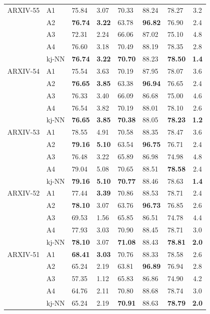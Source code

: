 \begin{table}
\begin{tabularx}{\columnwidth}{XXXXXXX|c}
		ARXIV-55 & A1    & 75.84  & 3.07  & 70.33  & 88.24       & 78.27 & 3.2  \\
		& A2    & \bfseries76.74  & \bfseries3.22  & 63.78  & \bfseries96.82       & 76.90 & 2.4  \\
		& A3    & 72.31  & 2.24  & 66.06  & 87.02       & 75.10 & 4.8  \\
		& A4    & 76.60  & 3.18  & 70.49  & 88.19       & 78.35 & 2.8  \\
		& \gls{kj-NN} & \bfseries76.74  & \bfseries3.22  & \bfseries70.70  & 88.23       & \bfseries78.50 & \bfseries1.4  \\ \midrule
		ARXIV-54 & A1    & 75.54  & 3.63  & 70.19  & 87.95       & 78.07 & 3.6  \\
		& A2    & \bfseries76.65  & \bfseries3.85  & 63.38  & \bfseries96.94       & 76.65 & 2.4  \\
		& A3    & 76.33  & 3.40  & 66.09  & 86.68       & 75.00 & 4.6  \\
		& A4    & 76.54  & 3.82  & 70.19  & 88.01       & 78.10 & 2.6  \\
		& \gls{kj-NN} & \bfseries76.65  & \bfseries3.85  & \bfseries70.38  & 88.05       & \bfseries78.23 & \bfseries1.2  \\ \midrule
		ARXIV-53 & A1    & 78.55  & 4.91  & 70.58  & 88.35       & 78.47 & 3.6  \\
		& A2    & \bfseries79.16  & \bfseries5.10  & 63.54  & \bfseries96.75       & 76.71 & 2.4  \\
		& A3    & 76.48  & 3.22  & 65.89  & 86.98       & 74.98 & 4.8  \\
		& A4    & 79.04  & 5.08  & 70.65  & 88.51       & \bfseries78.58 & 2.4  \\
		& \gls{kj-NN} & \bfseries79.16  & \bfseries5.10  & \bfseries70.77  & 88.46       & 78.63 & \bfseries1.4  \\ \midrule
		ARXIV-52 & A1    & 77.44  & \bfseries3.39  & 70.86  & 88.53       & 78.71 & 2.4  \\
		& A2    & \bfseries78.10  & 3.07  & 63.76  & \bfseries96.73       & 76.85 & 2.6  \\
		& A3    & 69.53  & 1.56  & 65.85  & 86.51       & 74.78 & 4.4  \\
		& A4    & 77.93  & 3.03  & 70.90  & 88.45       & 78.71 & 3.0    \\
		& \gls{kj-NN} & \bfseries78.10  & 3.07  & \bfseries71.08  & 88.43       & \bfseries78.81 & \bfseries2.0    \\ \midrule
		ARXIV-51  & A1    & \bfseries68.41  & \bfseries3.03  & 70.76  & 88.33       & 78.58 & 2.6  \\
		& A2    & 65.24  & 2.19  & 63.81  & \bfseries96.89       & 76.94 & 2.8  \\
		& A3    & 57.35  & 1.12  & 65.83  & 86.86       & 74.90 & 4.2  \\
		& A4    & 64.76  & 2.11  & 70.80  & 88.68       & 78.74 & 3.0    \\
		& \gls{kj-NN} & 65.24  & 2.19  & \bfseries70.91  & 88.63       & \bfseries78.79 & \bfseries2.0    \\ \bottomrule
	\end{tabularx}
\end{table} 

